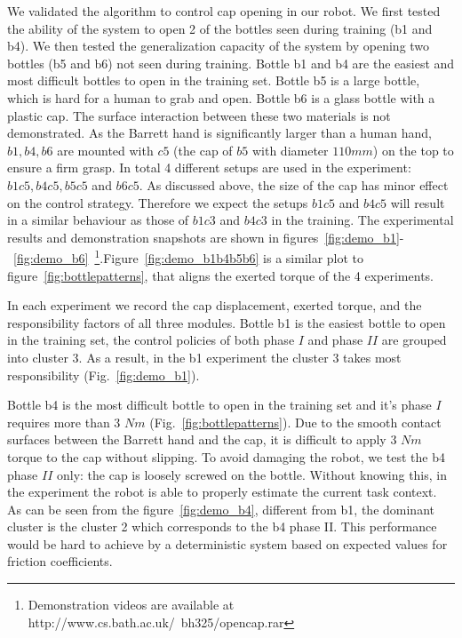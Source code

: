 
We validated the algorithm to control cap opening in our robot. We first tested the ability of the system to open 2 of the bottles seen during training (b1 and b4). We then tested the generalization capacity of the system by opening two bottles (b5 and b6) not seen during training.
Bottle b1 and b4 are the easiest and most difficult bottles to open in the training set.
Bottle b5 is a large bottle, which is hard for a human to grab and open. Bottle b6 is a glass bottle with a plastic cap. The surface interaction between these two materials is not demonstrated. As the Barrett hand is significantly larger than a human hand, $b1, b4, b6$ are mounted with $c5$ (the cap of $b5$ with diameter $110 mm$) on the top to ensure a firm grasp. In total 4 different setups are used in the experiment: $b1c5, b4c5, b5c5$ and $b6c5$. As discussed above, the size of the cap has minor effect on the control strategy. Therefore we expect the setups $b1c5$ and $b4c5$ will result in a similar behaviour as those of $b1c3$ and $b4c3$ in the training. The experimental results and demonstration snapshots are shown in figures~\ref{fig:demo_b1}-~\ref{fig:demo_b6}~\footnote{Demonstration
  videos are available at http://www.cs.bath.ac.uk/~bh325/opencap.rar}.Figure~\ref{fig:demo_b1b4b5b6} is a similar plot to figure~\ref{fig:bottlepatterns}, that aligns the exerted torque of the 4 experiments.

In each experiment we record the cap displacement, exerted torque, and the responsibility factors of all three modules. Bottle b1 is the easiest bottle to open in the training set, the control policies of both phase $I$ and phase $II$ are grouped into cluster 3. As a result, in the b1 experiment the cluster 3 takes most responsibility (Fig.~\ref{fig:demo_b1}).

Bottle b4 is the most difficult bottle to open in the training set and it's phase $I$ requires more than 3 $Nm$ (Fig.~\ref{fig:bottlepatterns}). Due to the smooth contact surfaces between the Barrett hand and the cap, it is difficult to apply 3 $Nm$ torque to the cap without slipping. To avoid damaging the robot, we test the b4 phase $II$ only: the cap is loosely screwed on the bottle. Without knowing this, in the experiment the robot is able to properly estimate the current task context. As can be seen from the figure~\ref{fig:demo_b4}, different from b1, the dominant cluster is the cluster 2 which corresponds to the b4 phase II. This performance would be hard to achieve by a deterministic system based on expected values for friction coefficients.

